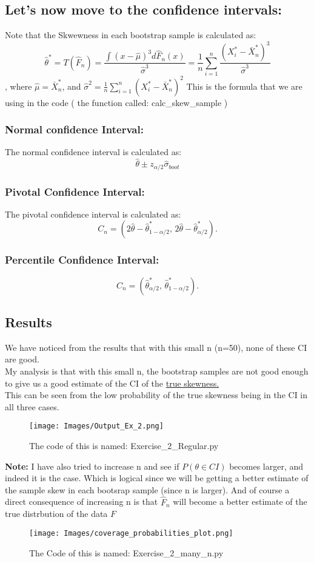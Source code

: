 \documentclass[12pt]{article}
\begin{document}
\subsection*{\textbf{Let's now move to the confidence intervals:} \\}
Note that the Skwewness in each bootstrap sample is calculated as:
\[
  \hat{\theta}^* = T(\hat{F}_n) = \frac{\int (x - \hat{\mu})^3 d \hat{F}_n(x)}{\hat{\sigma}^3} = \frac{1}{n} \sum_{i=1}^{n} \frac{(X_i^* - \bar{X}_n^*)^3}{\hat{\sigma}^3}
\],
where $\hat{\mu} = \bar{X}_n^*$, and $\hat{\sigma}^2 = \frac{1}{n} \sum_{i=1}^{n} (X_i^* - \bar{X}_n^*)^2$
This is the formula that we are using in the code ( the function called: calc\_skew\_sample )

\subsubsection*{Normal confidence Interval:}
The normal confidence interval is calculated as:
\[
  \hat{\theta} \pm z_{\alpha/2}  \hat{\sigma}_{boot}
\]

\subsubsection*{Pivotal Confidence Interval:}
The pivotal confidence interval is calculated as:
\[
  C_n = \left( 2\hat{\theta} - \hat{\theta}^*_{1-\alpha/2}, \, 2\hat{\theta} - \hat{\theta}^*_{\alpha/2} \right).
\]
\subsubsection*{Percentile Confidence Interval:}
\[
  C_n = \left( \hat{\theta}^*_{\alpha/2}, \, \hat{\theta}^*_{1-\alpha/2} \right).
\]
\subsection*{Results}
We have noticed from the results that with this small n (n=50), none of these CI are good. \\
My analysis is that with this small n, the bootstrap samples are not good enough to give us a good estimate of the CI of the \underline{true skewness.} \\
This can be seen from the low probability of the true skewness being in the CI in all three cases. \\
\begin{figure}[H]
  \centering
  \texttt{[image: Images/Output\_Ex\_2.png]}
  \caption{The code of this is named: Exercise\_2\_Regular.py}
\end{figure}
\textbf{Note:} I have also tried  to increase n and see if $P(\theta \in CI)$ becomes larger, and indeed it is the case. Which is logical since we will be getting a better estimate of the sample skew in each bootsrap sample (since n is larger). And of course a direct consequence of increasing n is that $\hat{F}_n$ will become a better estimate of the true distrbution of the data $F$
\begin{figure}[H]
  \centering
  \texttt{[image: Images/coverage\_probabilities\_plot.png]}
  \caption{The Code of this is named: Exercise\_2\_many\_n.py}
\end{figure}
\end{document}
